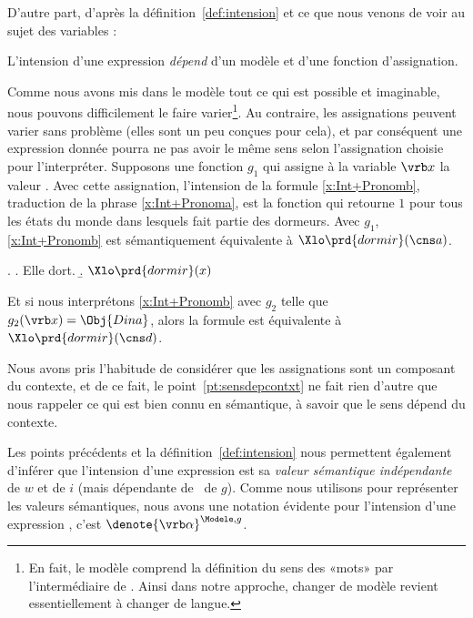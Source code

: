D'autre part, d'après la
définition~\ref{def:intension} et ce que nous venons de voir au sujet des variables :

\begin{point}\label{pt:sensdepcontxt}
{L'intension d'une expression
\emph{dépend} d'un modèle  et d'une fonction d'assignation.}
\end{point}


Comme nous avons mis dans le modèle  tout ce qui est possible et imaginable, nous pouvons difficilement le faire varier\footnote{En fait, le modèle comprend la définition du sens des «mots» par l'intermédiaire de \FI. Ainsi dans notre approche, changer de modèle revient essentiellement à changer de langue.}. 
Au contraire, les assignations peuvent varier sans problème (elles sont un peu conçues pour cela), et par conséquent une expression donnée pourra ne pas avoir le même sens selon l'assignation choisie pour l'interpréter.
Supposons une fonction $g_1$ qui assigne à la variable $\vrb x$ la valeur
. 
Avec cette assignation, l'intension de la formule \ref{x:Int+Pronomb}, traduction de la
phrase \ref{x:Int+Pronoma}, est la fonction qui retourne $1$ pour tous les
états du monde dans lesquels  fait partie des dormeurs. Avec $g_1$, 
\ref{x:Int+Pronomb} est sémantiquement équivalente à \(\Xlo\prd{dormir}(\cns a)\).

\ex. \label{x:Int+Pronom}
\a. Elle dort.\label{x:Int+Pronoma}
\b. \(\Xlo\prd{dormir}(x)\) \label{x:Int+Pronomb}

Et si nous interprétons \ref{x:Int+Pronomb} avec $g_2$ telle que
$g_2(\vrb x)=\Obj{Dina}$, alors  la formule est équivalente à \(\Xlo\prd{dormir}(\cns d)\). 


Nous avons pris l'habitude de considérer que les assignations sont un composant du contexte, et de ce fait, le point~\ref{pt:sensdepcontxt} ne fait rien d'autre que nous rappeler ce qui est bien connu en sémantique, à savoir que le sens dépend du contexte.

Les points précédents et la définition~\ref{def:intension} nous permettent également d'inférer que
l'intension d'une expression est sa \emph{valeur sémantique indépendante} de $w$ et de $i$ (mais dépendante de \Modele\ de $g$).  Comme nous utilisons \denote{\cdot} pour représenter les valeurs sémantiques, nous avons une notation évidente pour l'intension d'une expression \vrb\alpha, c'est \(\denote{\vrb\alpha}^{\Modele,g}\).


